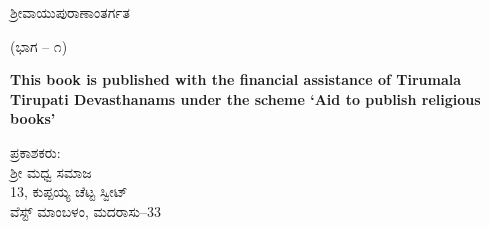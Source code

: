 \thispagestyle{empty}

\begin{center}
 ಶ‍್ರೀವಾಯುಪುರಾಣಾಂತರ್ಗತ 
\end{center}


\begin{center}
(ಭಾಗ – ೧)
\end{center}

\begin{center}
\textbf{This book is published with the financial assistance of Tirumala Tirupati Devasthanams under the scheme `Aid to publish religious books'}
\end{center}


\begin{center}
ಪ್ರಕಾಶಕರು: \\ ಶ‍್ರೀ ಮಧ್ವ ಸಮಾಜ \\ 13, ಕುಪ್ಪಯ್ಯ ಚೆಟ್ಟ ಸ್ವೀಟ್ \\ ವೆಸ್ಟ್ ಮಾಂಬಳಂ, ಮದರಾಸು–33
\end{center}

